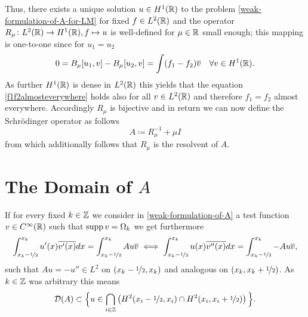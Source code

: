 Thus, there exists a unique solution $u \in H^{1}(\mathbb{R})$ to the problem \eqref{weak-formulation-of-A-for-LM} for fixed $f \in L^{2}(\mathbb{R})$ and  the operator $R_{\mu} \colon L^{2}(\mathbb{R}) \rightarrow H^{1}(\mathbb{R}), f \mapsto u$ is well-defined for $\mu \in \mathbb{R}$ small enough; this mapping is one-to-one since for $u_{1} = u_{2}$
	\begin{equation}
		0 = B_{\mu}[u_{1}, v] - B_{\mu}[u_{2}, v]= \int (f_{1} - f_{2}) \overline{v} \quad \forall v \in H^{1}(\mathbb{R}). \label{f1f2almosteverywhere}
	\end{equation} 
As further $H^{1}(\mathbb{R})$ is dense in $L^{2}(\mathbb{R})$ this yields that the equation \eqref{f1f2almosteverywhere} holds also for all $v \in L^{2}(\mathbb{R})$ and therefore $f_{1} = f_{2}$ almost everywhere. Accordingly $R_{\mu}$ is bijective and in return we can now define the Schrödinger operator as follows %
		\[ A \coloneqq R_{\mu}^{-1} + \mu I \]
from which additionally follows that $R_{\mu}$ is the resolvent of $A$.

\section{\texorpdfstring{The Domain of $A$}{The Domain of A}}
If for every fixed $k \in \mathbb{Z}$ we consider in \eqref{weak-formulation-of-A} a test function $v \in C^{\infty}(\mathbb{R})$ such that $\operatorname{supp} v = \Omega_{k}$ we get furthermore
	\[ \int_{x_{k}-\nicefrac{1}{2}}^{x_{k}} u'(x) \overline{v'(x)} dx = \int_{x_{k}-\nicefrac{1}{2}}^{x_{k}} A u \overline{v} \iff \int_{x_{k}-\nicefrac{1}{2}}^{x_{k}} u(x) \overline{v''(x)} dx = \int_{x_{k}-\nicefrac{1}{2}}^{x_{k}} - A u \overline{v}, \]
such that $A u = - u'' \in L^{2}$ on $(x_{k} -\nicefrac{1}{2}, x_{k})$ and analogous on $(x_{k}, x_{k} + \nicefrac{1}{2})$. %
As $k \in \mathbb{Z}$ was arbitrary this means 
	$$ \mathcal{D}(A) \subset \Big\{ u \in \bigcap_{i \in \mathbb{Z}} \left( H^{2}(x_{i}-\nicefrac{1}{2}, x_{i}) \cap H^{2}(x_{i}, x_{i} + \nicefrac{1}{2}) \right) \Big\}. $$
	
